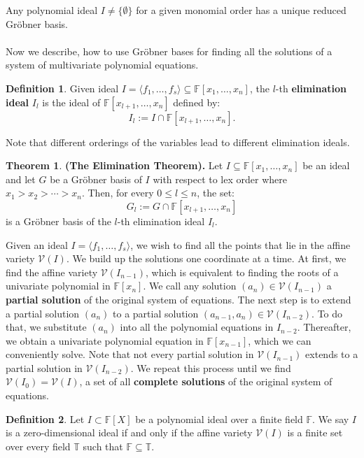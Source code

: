 \documentclass[thesis=M,english]{FITthesis}[2012/10/20]
\theoremstyle{remark}
\theoremstyle{definition}
\newtheorem{DF}{Definition}[section]
\newtheorem{theorem}{Theorem}[section]
\begin{document}
\noindent Any polynomial ideal $I\neq \{\emptyset\}$ for a given monomial order has a unique reduced Gröbner basis. 
\\
\\
\noindent Now we describe, how to use Gröbner bases for finding all the solutions of a system of multivariate polynomial equations.
\begin{DF}
Given ideal $I = \langle f_1,\ldots,f_s\rangle \subseteq \mathbb{F}[x_1,\ldots,x_n]$, the $l$-th \textbf{elimination ideal} $I_l$ is the ideal of $\mathbb{F}[x_{l+1},\ldots,x_n]$ defined by:
$$
I_l := I \cap \mathbb{F}[x_{l+1},\ldots,x_n].
$$
\end{DF}
\noindent Note that different orderings of the variables lead to different elimination ideals.
\begin{theorem}
\textbf{(The Elimination Theorem).} Let $I \subseteq \mathbb{F}[x_1,\ldots,x_n]$ be an ideal and let $G$ be a Gröbner basis of $I$ with respect to lex order where $x_1 > x_2 > \cdots > x_n$. Then, for every $0\leq l \leq n$, the set:
$$
G_l := G \cap \mathbb{F}[x_{l+1},\ldots,x_n]
$$
is a Gröbner basis of the $l$-th elimination ideal $I_l$.
\end{theorem}
\vphantom{.}
\noindent Given an ideal $I = \langle f_1,\ldots,f_s \rangle$, we wish to find all the points that lie in the affine variety $\mathcal{V}(I)$. We build up the solutions one coordinate at a time. At first, we find the affine variety $\mathcal{V}(I_{n-1})$, which is equivalent to finding the roots of a univariate polynomial in $\mathbb{F}[x_n]$. We call any solution $(a_n) \in \mathcal{V}(I_{n-1})$ a \textbf{partial solution} of the original system of equations. The next step is to extend a partial solution $(a_n)$ to a partial solution $(a_{n-1},a_n) \in \mathcal{V}(I_{n-2})$. To do that, we substitute $(a_n)$ into all the polynomial equations in $I_{n-2}$. Thereafter, we obtain a univariate polynomial equation in $\mathbb{F}[x_{n-1}]$, which we can conveniently solve. Note that not every partial solution in $\mathcal{V}(I_{n-1})$ extends to a partial solution in $\mathcal{V}(I_{n-2})$. We repeat this process until we find $\mathcal{V}(I_0) = \mathcal{V}(I)$, a set of all \textbf{complete solutions} of the original system of equations.
\begin{DF}
Let $I \subset \mathbb{F}[X]$ be a polynomial ideal over a finite field $\mathbb{F}$. We say $I$ is a zero-dimensional ideal if and only if the affine variety $\mathcal{V}(I)$ is a finite set over every field $\mathbb{T}$ such that $\mathbb{F} \subseteq\mathbb{T}$.
\end{DF}
\end{document}
